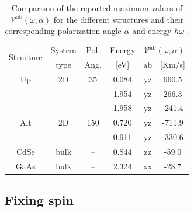 \documentclass[floatfix,prb,aps,superscriptaddress,showpacs,11pt,preprint,letterpaper]{revtex4}
\begin{document}
\begin{table}
\begin{tabular}{cccccc}
\hline
\multirow{2}{*}{Structure \quad} & 
System \quad & 
Pol. &
Energy & 
\multicolumn{2}{c}{$\mathcal{V}^{\mathrm{ab}}(\omega,\alpha)$}\\
\cline{5-6}
& type & Ang. & [eV] & $\mathrm{ab}$ \quad & [Km/s]\\
\hline
Up  & 2D   & 35    & 0.084  & $\mathrm{yz}$ &  660.5 \\
      &      &       & 1.954  & $\mathrm{yz}$ &  266.3 \\
      &      &       & 1.958  & $\mathrm{yz}$ & -241.4 \\
Alt & 2D   & 150   & 0.720  & $\mathrm{yz}$ & -711.9 \\
      &      &       & 0.911  & $\mathrm{yz}$ & -330.6 \\
CdSe  & bulk & --    & 0.844  & $\mathrm{zz}$ &  -59.0 \\
GaAs  & bulk & --    & 2.324  & $\mathrm{xx}$ &  -28.7 \\
\hline
\end{tabular}
\caption{Comparison of the reported maximum values of
$\mathcal{V}^{\mathrm{ab}}(\omega,\alpha)$ for the different structures and
their corresponding polarization angle $\alpha$ and energy $\hbar\omega$ . }
\label{tab:vab-str-comp}
\end{table}

\subsection{Fixing spin}
\label{sec:res-fixspin}
\end{document}
